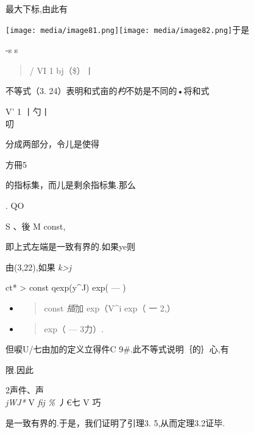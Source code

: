 最大下标,由此有

\texttt{[image: media/image81.png]}\texttt{[image: media/image82.png]}于是

-s s

\begin{quote}
/ VI 1 \textbar{}bj（\$）丨
\end{quote}

不等式（3. 24）表明和式亩的\emph{杓}不妨是不同的•将和式

V' {1 丨勺丨\\
}叨

分成两部分，令儿是使得

方冊5

的指标集，而儿是剩余指标集.那么

. QO

S 、後 M const,

即上式左端是一致有界的.如果ye则

由(3,22),如果 \emph{k\textgreater{}j}

\textbar{}ct*\textbar{} \textgreater{} const
\textbar{}q\textbar{}exp(y\^{}J) exp( --- )

\begin{itemize}
\item
  \begin{quote}
  const \emph{插}加 \textbar{}exp（V\^{}i exp（ 一 2,）
  \end{quote}
\item
  \begin{quote}
  exp（ --- 3力）.
  \end{quote}
\end{itemize}

但唳U/七由加的定义立得件C 9\#.此不等式说明｛的｝心,有

限.因此

2声件、声\\
\emph{jWJ*} V \emph{fij \%} 丿€七 V 巧

是一致有界的.于是，我们证明了引理3. 5,从而定理3.2证毕.\textbar{}